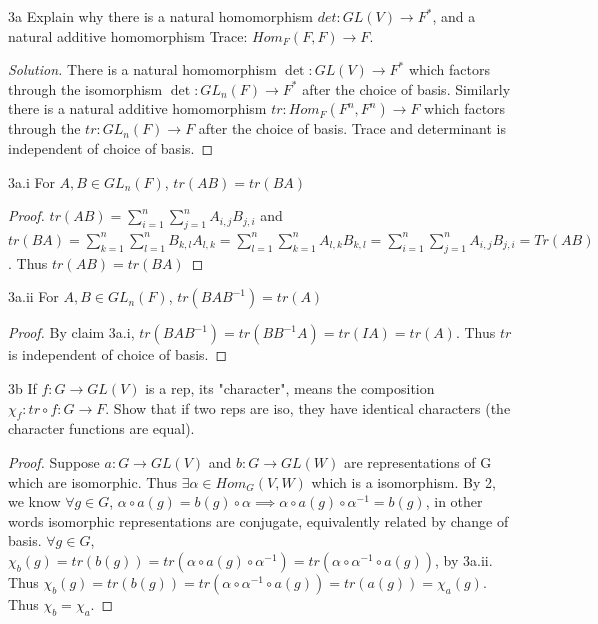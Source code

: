 \documentclass{article}
\newenvironment{solution}
{\renewcommand\qedsymbol{$\blacksquare$}\begin{proof}[Solution]}
{\end{proof}}
\begin{document}
\bigskip

\begin{PROB}{3a}\label{Problem 3.}
    Explain why there is a natural homomorphism $det: GL(V) \to F^*$, and a natural additive homomorphism Trace: $Hom_F(F,F) \to F$.  
\end{PROB}
\begin{solution}
    There is a natural homomorphism $\det: GL(V) \to F^*$ which factors through the isomorphism $\det: GL_n(F) \to F^*$ after the choice of basis. Similarly there is a natural additive homomorphism $tr : Hom_F(F^n, F^n) \to F$ which factors through the $tr: GL_n(F) \to F$ after the choice of basis. Trace and determinant is independent of choice of basis. 
\end{solution}

\begin{claim}{3a.i}\label{Claim 3a.i.}
    For $A, B \in GL_n(F)$, $tr(AB) = tr(BA)$
\end{claim}
\begin{proof}
    $tr(AB) = \sum_{i = 1}^{n} \sum_{j = 1}^{n} A_{i, j} B_{j, i}$ and $tr(BA) = \sum_{k = 1}^{n} \sum_{l = 1}^{n} B_{k, l} A_{l, k} = \sum_{l = 1}^{n} \sum_{k = 1}^{n} A_{l, k} B_{k, l} = \sum_{i = 1}^{n} \sum_{j = 1}^{n} A_{i, j} B_{j, i} = Tr(AB)$. Thus $tr(AB) = tr(BA)$
\end{proof}

\begin{claim}{3a.ii}\label{Claim 3a.ii.}
    For $A, B \in GL_n(F)$, $tr(BAB^{-1}) = tr(A)$
\end{claim}
\begin{proof}
    By claim 3a.i, $tr(BAB^{-1}) = tr(BB^{-1}A) = tr(IA) = tr(A)$. Thus $tr$ is independent of choice of basis.   
\end{proof}

\begin{claim}{3b}\label{Claim 3b.}
    If $f: G \to GL(V)$ is a rep, its "character", means the composition $\chi_f: tr \circ f: G \to F$. Show that if two reps are iso, they have identical characters (the character functions are equal).
\end{claim}
\begin{proof}
    Suppose $a: G \to GL(V)$ and $b: G \to GL(W)$ are representations of G which are isomorphic. Thus $\exists \alpha \in Hom_G(V, W)$ which is a isomorphism. By 2, we know $\forall g \in G$, $\alpha \circ a(g) = b(g) \circ \alpha \implies \alpha \circ a(g) \circ \alpha^{-1} = b(g)$, in other words isomorphic representations are conjugate, equivalently related by change of basis. $\forall g \in G$, $\chi_b(g) = tr(b(g)) = tr(\alpha \circ a(g) \circ \alpha^{-1})= tr(\alpha \circ \alpha^{-1} \circ a(g))$, by 3a.ii. Thus $\chi_b(g) =tr(b(g))= tr(\alpha \circ \alpha^{-1} \circ a(g)) = tr(a(g)) = \chi_a(g)$. Thus $\chi_b = \chi_a$.
\end{proof}
\end{document}

